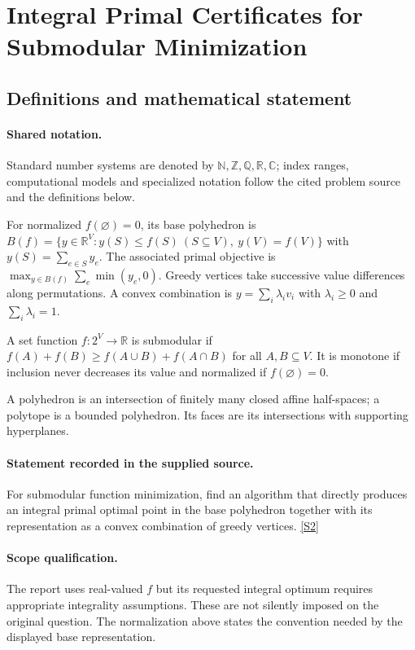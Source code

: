 \documentclass[11pt]{article}
\newcommand{\sref}[2]{\hyperlink{source:#1:#2}{[S#2]}}
\begin{document}
\section{Integral Primal Certificates for Submodular Minimization}\label{statement}

\subsection{Definitions and mathematical statement}

\paragraph{Shared notation.}Standard number systems are denoted by $\mathbb N,\mathbb Z,\mathbb Q,\mathbb R,\mathbb C$; index ranges, computational models and specialized notation follow the cited problem source and the definitions below.


For normalized $f(\varnothing)=0$, its base polyhedron is $B(f)=\{y\in\mathbb R^V:y(S)\leq f(S)\ (S\subseteq V),\ y(V)=f(V)\}$ with $y(S)=\sum_{e\in S}y_e$. The associated primal objective is $\max_{y\in B(f)}\sum_e\min(y_e,0)$. Greedy vertices take successive value differences along permutations. A convex combination is $y=\sum_i\lambda_i v_i$ with $\lambda_i\geq0$ and $\sum_i\lambda_i=1$.

A set function $f:2^V\to\mathbb R$ is submodular if $f(A)+f(B)\geq f(A\cup B)+f(A\cap B)$ for all $A,B\subseteq V$. It is monotone if inclusion never decreases its value and normalized if $f(\varnothing)=0$.

A polyhedron is an intersection of finitely many closed affine half-spaces; a polytope is a bounded polyhedron. Its faces are its intersections with supporting hyperplanes.
\paragraph{Statement recorded in the supplied source.}
For submodular function minimization, find an algorithm that directly produces an integral primal optimal point in the base polyhedron together with its representation as a convex combination of greedy vertices. \sref{statement}{2}
\paragraph{Scope qualification.}
The report uses real-valued $f$ but its requested integral optimum requires appropriate integrality assumptions. These are not silently imposed on the original question. The normalization above states the convention needed by the displayed base representation.
\end{document}
